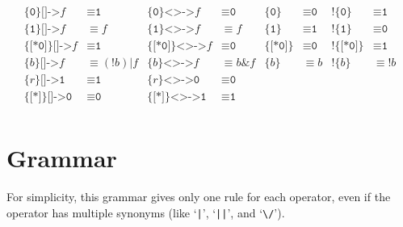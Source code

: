\documentclass[a4paper,twoside,10pt,DIV=12]{scrreprt}
\DeclareMathOperator{\NOT}{\texttt{!}}
\newcommand{\OR}{\mathbin{\texttt{|}}}
\newcommand{\AND}{\mathbin{\texttt{\&}}}
\newcommand{\0}{\texttt{0}}
\newcommand{\1}{\texttt{1}}
\newcommand{\STAR}[1]{\texttt{[*#1]}}
\newcommand{\eword}{\texttt{[*0]}}
\newcommand{\Esuffix}{\texttt{<>->}}
\newcommand{\Asuffix}{\texttt{[]->}}
\newcommand{\sere}[1]{\texttt{\{}#1\texttt{\}}}
\newcommand{\nsere}[1]{\texttt{!\{}#1\texttt{\}}}
\newcommand\samp[1]{`\texttt{#1}'}
\begin{document}
\begin{align*}
  \sere{\0}\Asuffix f &\equiv \1
& \sere{\0}\Esuffix f &\equiv \0
& \sere{\0} & \equiv \0
& \nsere{\0} & \equiv \1 \\
  \sere{\1}\Asuffix f &\equiv f
& \sere{\1}\Esuffix f &\equiv f
& \sere{\1} & \equiv \1
& \nsere{\1} & \equiv \0 \\
  \sere{\eword}\Asuffix f&\equiv \1
& \sere{\eword}\Esuffix f&\equiv \0
& \sere{\eword} & \equiv \0
& \nsere{\eword} & \equiv \1 \\
  \sere{b}\Asuffix f&\equiv (\NOT{b})\OR f
& \sere{b}\Esuffix f&\equiv b\AND f
& \sere{b} &\equiv b
& \nsere{b} &\equiv \NOT b\\
  \sere{r}\Asuffix \1&\equiv \1
& \sere{r}\Esuffix \0&\equiv \0  \\
  \sere{\STAR{}} \Asuffix \0 &\equiv \0
& \sere{\STAR{}} \Esuffix \1 &\equiv \1 \\
\end{align*}

\chapter{Grammar}

For simplicity, this grammar gives only one rule for each
operator, even if the operator has multiple synonyms (like \samp{|},
\samp{||}, and {`\verb=\/='}).
\end{document}
